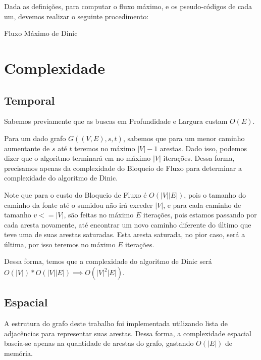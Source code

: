 \documentclass[
	12pt,
	a4paper,
	onepage,
	brazil
]{article}
\theoremstyle{definition}
\begin{document}
	Dada as definições, para computar o fluxo máximo, e os pseudo-códigos de cada um, devemos realizar o seguinte procedimento:
	
	\begin{algorithm}[H]
	\SetAlgoLined
	
	
	\caption{Fluxo Máximo de Dinic}
	\end{algorithm}
	
	\section{Complexidade}
	
	\subsection{Temporal}
	
	Sabemos previamente que as buscas em Profundidade e Largura custam $O(E)$.
	
	Para um dado grafo $G((V,E), s, t)$, sabemos que para um menor caminho aumentante de $s$ até $t$ teremos no máximo $|V|-1$ arestas. Dado isso, podemos dizer que o algoritmo terminará em no máximo $|V|$ iterações. Dessa forma, precisamos apenas da complexidade do Bloqueio de Fluxo para determinar a complexidade do algoritmo de Dinic.
	
	Note que para o custo do Bloqueio de Fluxo é $O(|V||E|)$, pois o tamanho do caminho da fonte até o sumidou não irá exceder $|V|$, e para cada caminho de tamanho $v <= |V|$, são feitas no máximo $E$ iterações, pois estamos passando por cada aresta novamente, até encontrar um novo caminho diferente do último que teve uma de suas arestas saturadas. Esta aresta saturada, no pior caso, será a última, por isso teremos no máximo $E$ iterações.
	
	Dessa forma, temos que a complexidade do algoritmo de Dinic será $O(|V|)*O(|V||E|) \implies O(|V|^2|E|)$.
	
	\subsection{Espacial}
	
	A estrutura do grafo deste trabalho foi implementada utilizando lista de adjacências para representar suas arestas. Dessa forma, a complexidade espacial baseia-se apenas na quantidade de arestas do grafo, gastando $O(|E|)$ de memória.
	
\end{document}
